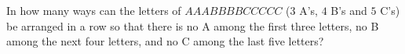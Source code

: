 In how many ways can the letters of $AAABBBBCCCCC$ ($3$ A's, $4$ B's and $5$ C's) be arranged in a row so that there is no A among the first three letters, no B among the next four letters, and no C among the last five letters?
